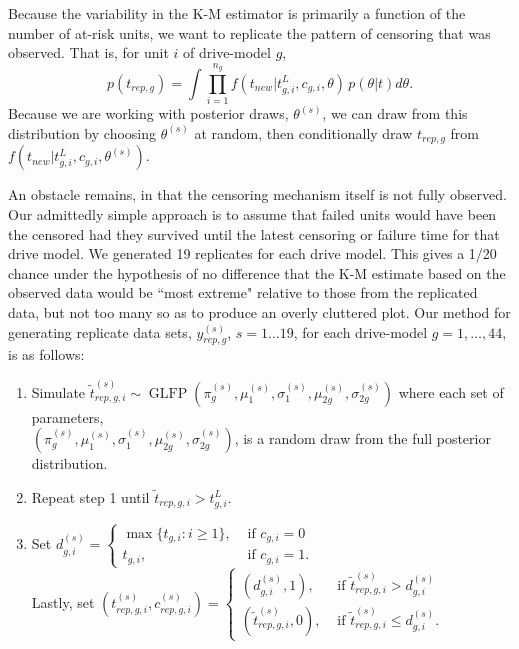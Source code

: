 \documentclass[aap]{imsart}
\newcommand{\op}{\operatorname}
\begin{document}
Because the variability in the K-M estimator is primarily a function of the number of at-risk units, we want to replicate the pattern of censoring that was observed. That is, for unit $i$ of drive-model $g$,
$$p(t_{rep,g}) = \int \prod_{i=1}^{n_g}f(t_{new}|t_{g,i}^L,c_{g,i},\theta)\,p(\theta|t)d\theta.$$
Because we are working with posterior draws, $\theta^{(s)}$, we can draw from this distribution by choosing $\theta^{(s)}$ at random, then conditionally draw $t_{rep,g}$ from $f(t_{new}|t_{g,i}^L,c_{g,i},\theta^{(s)}).$

An obstacle remains, in that the censoring mechanism itself is not fully observed. Our admittedly simple approach is to assume that failed units would have been the censored had they survived until the latest censoring or failure time for that drive model. We generated 19 replicates for each drive model. This gives a 1/20 chance under the hypothesis of no difference that the K-M estimate based on the observed data would be ``most extreme" relative to those from the replicated data, but not too many so as to produce an overly cluttered plot. Our method for generating replicate data sets, $y_{rep,g}^{(s)}$, $s = 1 \dots 19$, for each drive-model $g=1,\ldots,44$, is as follows:
\begin{enumerate}
\item Simulate $\tilde{t}_{rep,g,i}^{(s)} \sim \op{GLFP}(\pi_{g}^{(s)},\mu_1^{(s)},\sigma_1^{(s)},\mu_{2g}^{(s)}, \sigma_{2g}^{(s)})$ where each set of parameters, \\$\left( \pi_{g}^{(s)},\mu_1^{(s)},\sigma_1^{(s)},\mu_{2g}^{(s)}, \sigma_{2g}^{(s)} \right)$, is a random draw from the full posterior distribution.
\item Repeat step 1 until $\tilde{t}_{rep,g,i} > t_{g,i}^L$.
\item Set $d_{g,i}^{(s)}= \begin{cases} \max \{t_{g,i}: i \ge 1\}, & \mbox{ if }c_{g,i}=0\\
t_{g,i}, & \mbox{ if }c_{g, i}=1. \end{cases}$\\
Lastly, set $(t_{rep,g,i}^{(s)},c_{rep,g,i}^{(s)}) = \begin{cases}
  (d_{g,i}^{(s)},1), & \mbox{ if } \tilde{t}_{rep,g,i}^{(s)}>d_{g,i}^{(s)}\\
  (\tilde{t}_{rep,g,i}^{(s)},0), & \mbox{ if }\tilde{t}_{rep,g,i}^{(s)} \le d_{g,i}^{(s)}.
\end{cases}$
\end{enumerate}
\end{document}
